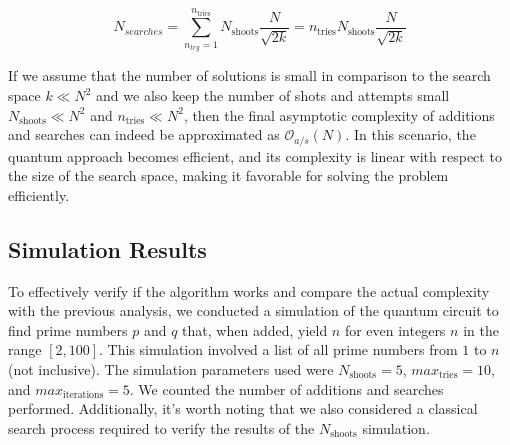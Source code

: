 \documentclass[12pt, a4paper]{article}
\begin{document}
    \begin{equation}
        N_{searches} = \sum_{n_{try}=1}^{n_\text{tries}} N_\text{shoots} \frac{N}{\sqrt{2k}} = n_\text{tries} N_\text{shoots} \frac{N}{\sqrt{2k}}
    \end{equation}

    If we assume that the number of solutions is small in comparison to the search space $k\ll N^2$ and we also keep the number of shots and attempts small $N_\text{shoots}\ll N^2$ and $n_\text{tries}\ll N^2$, then the final asymptotic complexity of additions and searches can indeed be approximated as $\mathcal{O}_{a/s}(N)$. In this scenario, the quantum approach becomes efficient, and its complexity is linear with respect to the size of the search space, making it favorable for solving the problem efficiently.

    \subsection{Simulation Results}

    To effectively verify if the algorithm works and compare the actual complexity with the previous analysis, we conducted a simulation of the quantum circuit to find prime numbers $p$ and $q$ that, when added, yield $n$ for even integers $n$ in the range $[2, 100]$. This simulation involved a list of all prime numbers from $1$ to $n$ (not inclusive). The simulation parameters used were $N_\text{shoots}=5$, $max_\text{tries}=10$, and $max_\text{iterations}=5$. We counted the number of additions and searches performed. Additionally, it's worth noting that we also considered a classical search process required to verify the results of the $N_{\text{shoots}}$ simulation.


    \nocite{*}
    
    
\end{document}
